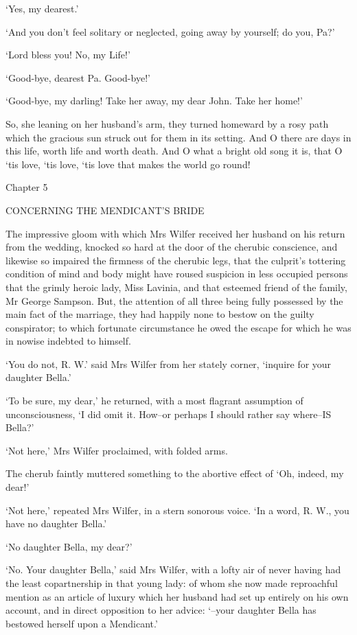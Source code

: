 ‘Yes, my dearest.’

‘And you don’t feel solitary or neglected, going away by yourself; do
you, Pa?’

‘Lord bless you! No, my Life!’

‘Good-bye, dearest Pa. Good-bye!’

‘Good-bye, my darling! Take her away, my dear John. Take her home!’

So, she leaning on her husband’s arm, they turned homeward by a rosy
path which the gracious sun struck out for them in its setting. And O
there are days in this life, worth life and worth death. And O what a
bright old song it is, that O ‘tis love, ‘tis love, ‘tis love that makes
the world go round!



Chapter 5

CONCERNING THE MENDICANT’S BRIDE


The impressive gloom with which Mrs Wilfer received her husband on his
return from the wedding, knocked so hard at the door of the cherubic
conscience, and likewise so impaired the firmness of the cherubic legs,
that the culprit’s tottering condition of mind and body might have
roused suspicion in less occupied persons that the grimly heroic lady,
Miss Lavinia, and that esteemed friend of the family, Mr George Sampson.
But, the attention of all three being fully possessed by the main
fact of the marriage, they had happily none to bestow on the guilty
conspirator; to which fortunate circumstance he owed the escape for
which he was in nowise indebted to himself.

‘You do not, R. W.’ said Mrs Wilfer from her stately corner, ‘inquire
for your daughter Bella.’

‘To be sure, my dear,’ he returned, with a most flagrant assumption of
unconsciousness, ‘I did omit it. How--or perhaps I should rather say
where--IS Bella?’

‘Not here,’ Mrs Wilfer proclaimed, with folded arms.

The cherub faintly muttered something to the abortive effect of ‘Oh,
indeed, my dear!’

‘Not here,’ repeated Mrs Wilfer, in a stern sonorous voice. ‘In a word,
R. W., you have no daughter Bella.’

‘No daughter Bella, my dear?’

‘No. Your daughter Bella,’ said Mrs Wilfer, with a lofty air of never
having had the least copartnership in that young lady: of whom she now
made reproachful mention as an article of luxury which her husband had
set up entirely on his own account, and in direct opposition to her
advice: ‘--your daughter Bella has bestowed herself upon a Mendicant.’

